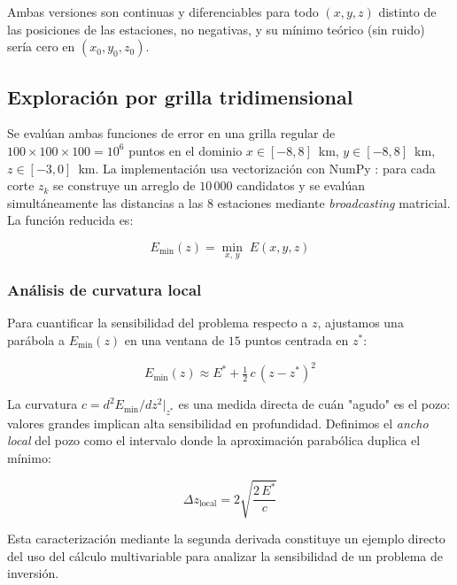 \documentclass[12pt, a4paper]{article}
\begin{document}
Ambas versiones son continuas y diferenciables para todo $(x,y,z)$
distinto de las posiciones de las estaciones, no negativas, y su
mínimo teórico (sin ruido) sería cero en $(x_0, y_0, z_0)$.

\subsection{Exploración por grilla tridimensional}

Se evalúan ambas funciones de error en una grilla regular de
$100\times100\times100 = 10^6$ puntos en el dominio
$x \in [-8, 8]$~km, $y \in [-8, 8]$~km, $z \in [-3, 0]$~km. La
implementación usa vectorización con NumPy \cite{harris2020array}:
para cada corte $z_k$ se construye un arreglo de $10\,000$ candidatos
y se evalúan simultáneamente las distancias a las 8 estaciones
mediante \emph{broadcasting} matricial. La función reducida es:

\begin{equation}
    E_{\min}(z) = \min_{x,\,y}\; E(x, y, z)
    \label{eq:emin}
\end{equation}

\subsubsection*{Análisis de curvatura local}
\label{sec:curvatura_local}

Para cuantificar la sensibilidad del problema respecto a $z$, ajustamos
una parábola a $E_{\min}(z)$ en una ventana de $15$ puntos centrada en
$z^*$:

\begin{equation}
    E_{\min}(z) \approx E^* + \tfrac{1}{2}\,c\,(z - z^*)^2
    \label{eq:parabola}
\end{equation}

La curvatura $c = d^2 E_{\min}/dz^2\big|_{z^*}$ es una medida directa
de cuán "agudo" es el pozo: valores grandes implican alta sensibilidad
en profundidad. Definimos el \emph{ancho local} del pozo como el
intervalo donde la aproximación parabólica duplica el mínimo:

\begin{equation}
    \Delta z_{\text{local}} = 2\sqrt{\frac{2\, E^*}{c}}
    \label{eq:ancho_local}
\end{equation}

Esta caracterización mediante la segunda derivada constituye un
ejemplo directo del uso del cálculo multivariable para analizar la
sensibilidad de un problema de inversión.
\end{document}
